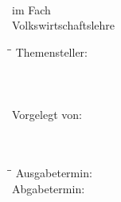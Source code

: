 \begin{titlepage}
\oddsidemargin=1.2cm








\begin{center}
  \Large %
  
  \myDegree\\ 
  im Fach\\
  Volkswirtschaftslehre

  
\vspace{2.0cm}
 
 \LARGE \textmd{\TitleGer}

\end{center}
 \vspace{3cm}
 
 \normalsize
\begin{minipage}{\textwidth}
    	\begin{tabbing}
    	\hspace{5cm} \= \myProf \= \kill
       Themensteller: \> \myProf \\
       \\
       \\
       \\
       Vorgelegt von: \> \myName \\
       	\> \myStreet \\
       	\> \myPlace \\
\end{tabbing}
\end{minipage}

\vfill

\normalsize
\begin{minipage}{\textwidth}
\begin{tabbing}
\hspace{5cm} \= \myProf \= \kill
Ausgabetermin: \> \myTime \\
Abgabetermin: \> \myDate \\
      \end{tabbing}
      
  \end{minipage}




\end{titlepage}
